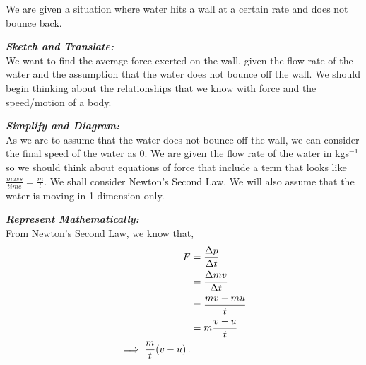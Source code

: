 %
%


\begin{subquestions}

\subquestion
We are given a situation where water hits a wall at a certain rate and does not bounce back.

\textbf{\textit{Sketch and Translate:}} \\
We want to find the average force exerted on the wall, given the flow rate of the water and the assumption that the water does not bounce off the wall. We should begin thinking about the relationships that we know with force and the speed/motion of a body.




\textbf{\textit{Simplify and Diagram:}} \\
As we are to assume that the water does not bounce off the wall, we can consider the final speed of the water as 0. We are given the flow rate of the water in kgs$^{-1}$ so we should think about equations of force that include a term that looks like $\frac{mass}{time}=\frac{m}{t}$. We shall consider Newton's Second Law. We will also assume that the water is moving in 1 dimension only.
	
	
	
	
\textbf{\textit{Represent Mathematically:}} \\
From Newton's Second Law, we know that, 
\begin{align}
	F & = \frac{\Delta p}{\Delta t} \nonumber \\
	  & = \frac{\Delta mv}{\Delta t} \nonumber \\
	  & = \frac{mv-mu}{t} \nonumber \\
	  & = m\frac{v-u}{t} \nonumber \\
	  \implies \frac{m}{t}(v-u) \,.
\end{align}


\end{subquestions}
